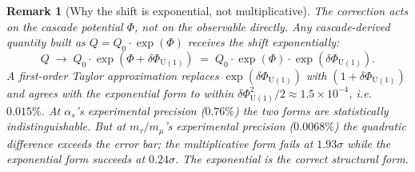 \documentclass[12pt,a4paper]{article}
\newtheorem*{remark}{Remark}
\begin{document}
\begin{remark}[Why the shift is exponential, not multiplicative]\label{rem:als-closure-exponential}
The correction acts on the cascade potential $\Phi$, not on the observable directly. Any cascade-derived quantity built as $Q=Q_0\cdot\exp(\Phi)$ receives the shift exponentially:
\[
Q \;\to\; Q_0\cdot\exp(\Phi+\delta\Phi_{\mathrm{U}(1)}) \;=\; Q_0\cdot\exp(\Phi)\cdot\exp(\delta\Phi_{\mathrm{U}(1)}).
\]
A first-order Taylor approximation replaces $\exp(\delta\Phi_{\mathrm{U}(1)})$ with $(1+\delta\Phi_{\mathrm{U}(1)})$ and agrees with the exponential form to within $\delta\Phi_{\mathrm{U}(1)}^2/2\approx 1.5\times 10^{-4}$, i.e.\ $0.015\%$. At $\alpha_s$'s experimental precision ($0.76\%$) the two forms are statistically indistinguishable. But at $m_\tau/m_\mu$'s experimental precision ($0.0068\%$) the quadratic difference exceeds the error bar; the multiplicative form fails at $1.93\sigma$ while the exponential form succeeds at $0.24\sigma$. The exponential is the correct structural form.
\end{remark}
\end{document}
